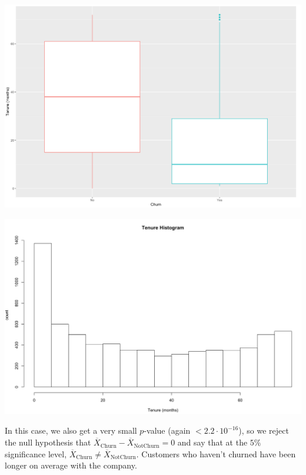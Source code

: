 \documentclass[man, floatsintext]{apa6}
\begin{document}
\noindent\begin{minipage}{0.485\textwidth}
\includegraphics[width = \linewidth]{boxplot_tenurebyChurn}
\end{minipage}
\hfill
\begin{minipage}{0.5\textwidth} 
\includegraphics[width = \linewidth]{histogram_Tenure}
\end{minipage}

\hspace{0.5mm}

In this case, we also get a very small $p$-value (again $< 2.2 \cdot 10^{-16}$), so we reject the null hypothesis that  $\overline{X}_{\text{Churn}} - \overline{X}_{\text{NotChurn}} = 0$ and say that at the $5 \%$ significance level, $\overline{X}_{\text{Churn}} \neq \overline{X}_{\text{NotChurn}}$. Customers who haven't churned have been longer on average with the company. 
\end{document}
